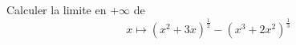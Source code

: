 Calculer la limite en $+\infty$ de
\begin{displaymath}
 x\mapsto (x^2+3x)^{\frac{1}{2}} - (x^3+2x^2)^{\frac{1}{3}}
\end{displaymath}
\bigskip